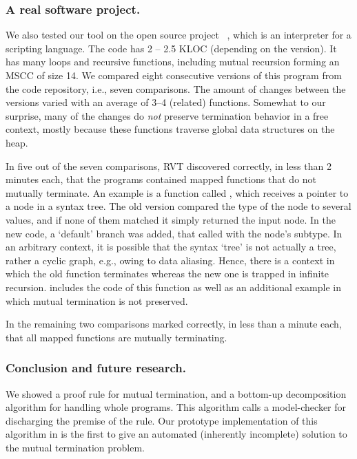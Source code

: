 \subsubsection{A real software project.}
We also tested our tool on the open source project ~\cite{Betik}, which is an interpreter for a scripting language. The code has 2 -- 2.5 KLOC (depending on the version). It has many loops and recursive functions, including mutual recursion forming an MSCC of size 14. %
%
We compared eight consecutive versions of this program from the code repository, i.e., seven comparisons. The amount of changes between the versions varied with an average of 3--4 (related) functions. Somewhat to our surprise, many of the changes do \emph{not} preserve termination behavior in a free context, mostly because these functions traverse global data structures on the heap.

In five out of the seven comparisons, RVT discovered correctly, in less than 2 minutes each, that the programs contained mapped functions that do not mutually terminate.
An example is a function
 called , which receives a pointer to a node in a syntax tree.
The old version compared the type of the node to several values, and if none of them
matched it simply returned the input node. In the new code, a `default' branch was added, that
called  with the node's subtype.
In an arbitrary context, it is possible that the syntax `tree' is not actually a tree, rather a cyclic graph, e.g., owing to data aliasing. Hence, there is a context in which the old function terminates whereas the new one is trapped in infinite recursion.   includes the code of this function as well as an additional example in which mutual termination is not preserved.

In the remaining two comparisons  marked correctly, in less than a minute each, that all mapped functions are mutually terminating.



\subsubsection{Conclusion and future research.}
We showed a proof rule for mutual termination, and a bottom-up decomposition algorithm for
handling whole programs. This algorithm calls a model-checker for discharging
the premise of the rule. Our prototype implementation of this algorithm in  is the first to
give an automated (inherently incomplete) solution to the mutual termination
problem.

